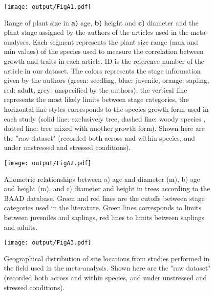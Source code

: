 \documentclass[a4paper]{article}\usepackage[]{graphicx}\usepackage[]{color}
\begin{document}
\begin{appendices}
\begin{figure}[htbp]
\centering
\texttt{[image: output/FigA1.pdf]}
\caption{Range of plant size in \textbf{a)} age, \textbf{b)} height and \textbf{c)} diameter and the plant stage assigned by the authors of the articles used in the meta-analyses. Each segment represents the plant size range (max and min values) of the species used to measure the correlation between growth and traits in each article. ID is the reference number of the article in our dataset. The colors represents the stage information given by the authors (green: seedling, blue: juvenile, orange: sapling, red: adult, grey: unspecified by the authors), the vertical line represents the most likely limits between stage categories, the horizontal line styles corresponds to the species growth form used in each study (solid line: exclusively tree, dashed line: woody species , dotted line: tree mixed with another growth form). Shown here are the "raw dataset" (recorded both across and within species, and under unstressed and stressed conditions).}
\label{FigA1}
\end{figure}


\begin{figure}[htbp]
\centering
\texttt{[image: output/FigA2.pdf]}
\caption{Allometric relationships between a) age and diameter (m), b) age and height (m), and c) diameter and height in trees according to the BAAD database. Green and red lines are the cutoffs between stage categories used in the literature. Green lines corresponds to limits between juveniles and saplings, red lines to limits between saplings and adults.}
\label{FigA2}
\end{figure}


\begin{figure}[htbp]
\centering
\texttt{[image: output/FigA3.pdf]}
\caption{Geographical distribution of site locations from studies performed in the field used in the meta-analysis. Shown here are the "raw dataset" (recorded both across and within species, and under unstressed and stressed conditions).}
\label{FigA3}
\end{figure}



\end{appendices}
\end{document}
